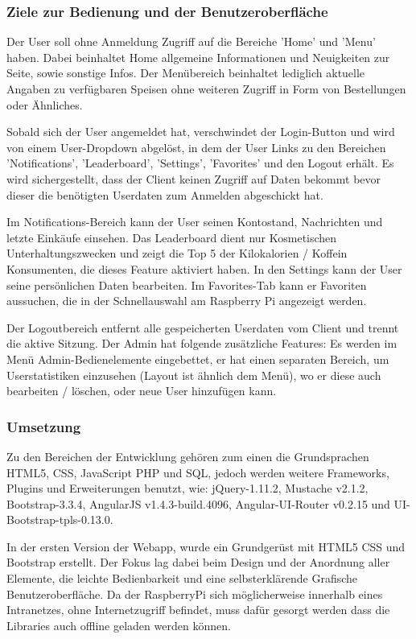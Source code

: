\documentclass[11pt,a4paper]{article} %
\begin{document}
\subsubsection{Ziele zur Bedienung und der Benutzeroberfläche}

Der User soll ohne Anmeldung Zugriff auf die Bereiche 'Home' und 'Menu' haben. Dabei beinhaltet Home allgemeine Informationen und Neuigkeiten zur Seite, sowie sonstige Infos. Der Menübereich beinhaltet lediglich aktuelle Angaben zu verfügbaren Speisen ohne weiteren Zugriff in Form von Bestellungen oder Ähnliches. 
\par
Sobald sich der User angemeldet hat, verschwindet der Login-Button und wird von einem User-Dropdown abgelöst, in dem der User Links zu den Bereichen 'Notifications', 'Leaderboard', 'Settings', 'Favorites' und den Logout erhält.  Es wird sichergestellt, dass der Client keinen Zugriff auf Daten bekommt bevor dieser die benötigten Userdaten zum Anmelden abgeschickt hat. 
\par
Im Notifications-Bereich kann der User seinen Kontostand, Nachrichten und letzte Einkäufe einsehen. Das Leaderboard dient nur Kosmetischen Unterhaltungszwecken und zeigt die Top 5 der Kilokalorien / Koffein Konsumenten, die dieses Feature aktiviert haben. In den Settings kann der User seine persönlichen Daten bearbeiten. Im Favorites-Tab kann er Favoriten aussuchen, die in der Schnellauswahl am Raspberry Pi angezeigt werden. 
\par
Der Logoutbereich entfernt alle gespeicherten Userdaten vom Client und trennt die aktive Sitzung. Der Admin hat folgende zusätzliche Features: Es werden im Menü Admin-Bedienelemente eingebettet, er hat einen separaten Bereich, um Userstatistiken einzusehen (Layout ist ähnlich dem Menü), wo er diese auch bearbeiten / löschen, oder neue User hinzufügen kann. 


\subsubsection{Umsetzung}

Zu den Bereichen der Entwicklung gehören zum einen die Grundsprachen HTML5, CSS, JavaScript PHP und SQL, jedoch werden weitere Frameworks, Plugins und Erweiterungen benutzt, wie: jQuery-1.11.2, Mustache v2.1.2, Bootstrap-3.3.4, AngularJS v1.4.3-build.4096, Angular-UI-Router v0.2.15 und UI-Bootstrap-tpls-0.13.0.
\par
In der ersten Version der Webapp, wurde ein Grundgerüst mit HTML5 CSS und Bootstrap erstellt. Der Fokus lag dabei beim Design und der Anordnung aller Elemente, die leichte Bedienbarkeit und eine selbsterklärende Grafische Benutzeroberfläche. Da der RaspberryPi sich möglicherweise innerhalb eines Intranetzes, ohne Internetzugriff befindet, muss dafür gesorgt werden dass die Libraries auch offline geladen werden können.
\end{document}
